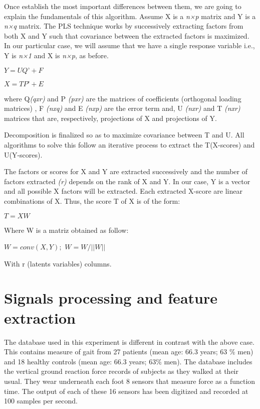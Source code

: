 Once establish the most important differences between them, we are going to explain the fundamentals of this algorithm. 
Assume X is a \textit{n×p} matrix and Y is a \textit{n×q} matrix. The PLS technique works by successively extracting factors from both X and Y such that covariance between the extracted factors is maximized. In our particular case, we will assume that we have a single response variable i.e., Y is \textit{n×1} and X is \textit{n×p}, as before.

\begin{center}
	$ Y= UQ’+F $

$ X=TP’+E $
\end{center}

where Q\textit{(qxr)} and P \textit{(pxr)} are the matrices of coefficients (orthogonal loading matrices) , F \textit{(nxq)} and E \textit{(nxp)} are the error term and, U \textit{(nxr)} and T \textit{(nxr)} matrices that are, respectively, projections of X and projections of Y.

Decomposition is finalized so as to maximize covariance between T and U. All algorithms to solve this follow an iterative process to extract the T(X-scores) and U(Y-scores)\cite{pls_pca}. 

The factors or scores for X and Y are extracted successively and the number of factors extracted \textit{(r)} depends on the rank of X and Y. In our case, Y is a vector and all possible X factors will be extracted.
Each extracted X-score are linear combinations of X. Thus, the score T of X is of the form: 

\begin{center}
	$ T= XW $
\end{center}

Where  W is a matriz obtained as follow:

\begin{center}
	$ W= conv(X,Y); $
$ W = W/||W|| $
\end{center}

With r (latents variables) columns.

\section{Signals processing and feature extraction}
The database used in this experiment  is different in contrast with the above case. This contains measure of gait from 27 patients (mean age: 66.3 years; 63 \% men) and 18 healthy controls (mean age: 66.3 years; 63\% men). The database includes the vertical ground reaction force records of subjects as they walked at their usual. They wear underneath each foot 8 sensors\cite{Instr6} that measure force as a function time. The output of each of these 16 sensors has been digitized and recorded at 100 samples per second.

